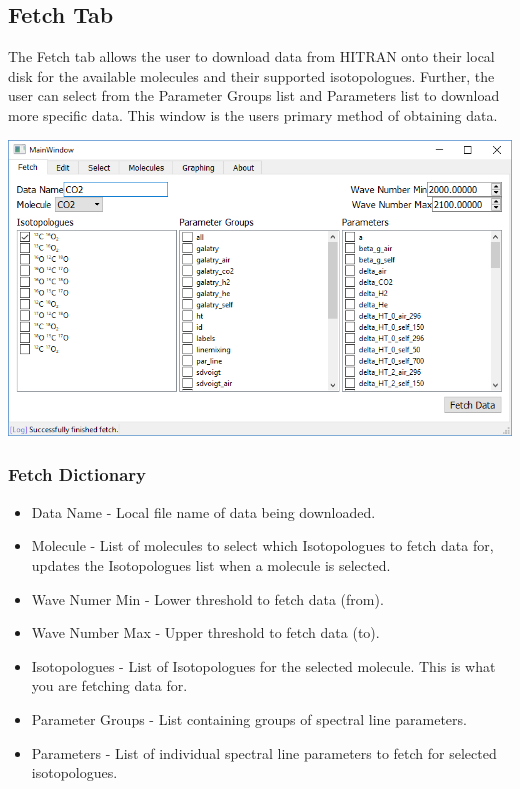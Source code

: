 \documentclass[12pt]{article}
\begin{document}
\subsection{Fetch Tab}
The Fetch tab allows the user to download data from HITRAN onto their local disk for the available molecules and their supported isotopologues. Further, the user can select from the Parameter Groups list and Parameters list to download more specific data. This window is the users primary method of obtaining data.
\begin{center}
\includegraphics[scale = 0.6]{MainWindow_Fetch}
\end{center}

\subsubsection*{Fetch Dictionary}
\begin{itemize}
\item Data Name - Local file name of data being downloaded.
\item Molecule - List of molecules to select which Isotopologues to fetch data for, updates the Isotopologues list when a molecule is selected.
\item Wave Numer Min - Lower threshold to fetch data (from).
\item Wave Number Max - Upper threshold to fetch data (to).
\item Isotopologues - List of Isotopologues for the selected molecule. This is what you are fetching data for.
\item Parameter Groups - List containing groups of spectral line parameters.
\item Parameters - List of individual spectral line parameters to fetch for selected isotopologues.
\end{itemize}
\newpage
\end{document}
